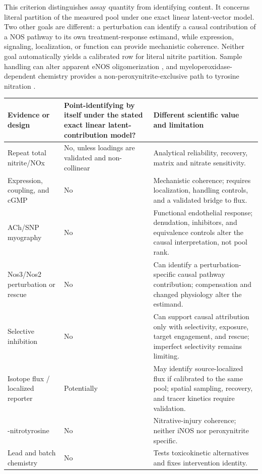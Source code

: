 \documentclass[11pt]{article}
\begin{document}
This criterion distinguishes assay quantity from identifying content. It concerns literal partition of the measured pool under one exact linear latent-vector model. Two other goals are different: a perturbation can identify a causal contribution of a NOS pathway to its own treatment-response estimand, while expression, signaling, localization, or function can provide mechanistic coherence. Neither goal automatically yields a calibrated row for literal nitrite partition. Sample handling can alter apparent eNOS oligomerization \citep{chang2019}, and myeloperoxidase-dependent chemistry provides a non-peroxynitrite-exclusive path to tyrosine nitration \citep{vandalen2000,gaut2002}.

\clearpage
\thispagestyle{fancy}
\enlargethispage{\baselineskip}
\begin{center}
\begin{minipage}{\textwidth}
\centering
\captionsetup{hypcap=false}
\label{tab:measurements}
\small
\scriptsize
\begin{tabularx}{\textwidth}{>{\raggedright\arraybackslash}p{}>{\raggedright\arraybackslash}p{}X}
\toprule
Evidence or design & Point-identifying by itself under the stated exact linear latent-contribution model? & Different scientific value and limitation \\
\midrule
Repeat total nitrite/NOx & No, unless loadings are validated and non-collinear & Analytical reliability, recovery, matrix and nitrate sensitivity. \\
Expression, coupling, and cGMP & No & Mechanistic coherence; requires localization, handling controls, and a validated bridge to flux. \\
ACh/SNP myography & No & Functional endothelial response; denudation, inhibitors, and equivalence controls alter the causal interpretation, not pool rank. \\
Nos3/Nos2 perturbation or rescue & No & Can identify a perturbation-specific causal pathway contribution; compensation and changed physiology alter the estimand. \\
Selective inhibition & No & Can support causal attribution only with selectivity, exposure, target engagement, and rescue; imperfect selectivity remains limiting. \\
Isotope flux / localized reporter & Potentially & May identify source-localized flux if calibrated to the same pool; spatial sampling, recovery, and tracer kinetics require validation. \\
3-nitrotyrosine & No & Nitrative-injury coherence; neither iNOS nor peroxynitrite specific. \\
Lead and batch chemistry & No & Tests toxicokinetic alternatives and fixes intervention identity. \\
\bottomrule
\end{tabularx}
\end{minipage}
\end{center}
\end{document}
